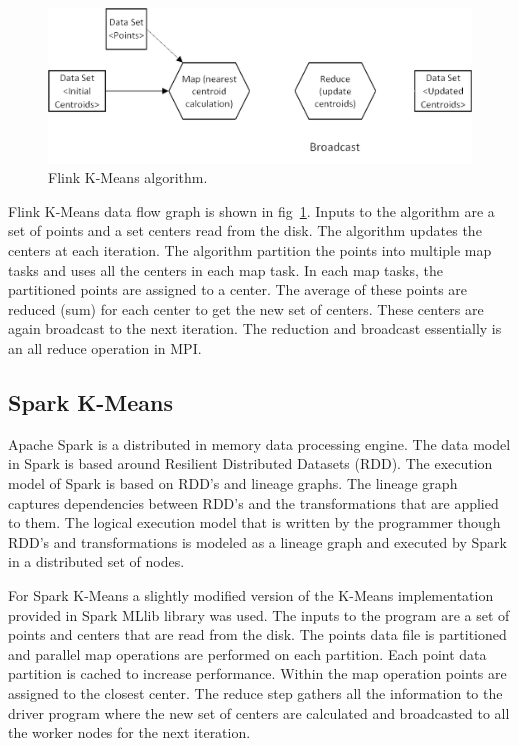 \documentclass[10pt, conference, compsocconf]{IEEEtran}
\begin{document}
\begin{figure}[!h]
\centering
\includegraphics[width=0.9\columnwidth]{images/fig_kmeans_dataflow}
\caption{Flink K-Means algorithm.}
\label{fig:fig_flink_kmeans}
\end{figure}

Flink K-Means data flow graph is shown in fig~\ref{fig:fig_flink_kmeans}. Inputs to the algorithm are a set of points and a set centers read from the disk. The algorithm updates the centers at each iteration. The algorithm partition the points into multiple map tasks and uses all the centers in each map task. In each map tasks, the partitioned points are assigned to a center. The average of these points are reduced (sum) for each center to get the new set of centers. These centers are again broadcast to the next iteration. The reduction and broadcast essentially is an all reduce operation in MPI.

\subsection{Spark K-Means}
Apache Spark is a distributed in memory data processing engine. The data model in Spark is based around Resilient Distributed Datasets (RDD). The execution model of Spark is based on RDD’s and lineage graphs. The lineage graph captures dependencies between RDD’s and the transformations that are applied to them. The logical execution model that is written by the programmer though RDD’s and transformations is modeled as a lineage graph and executed by Spark in a distributed set of nodes.

For Spark K-Means a slightly modified version of the K-Means implementation provided in Spark MLlib library was used. The inputs to the program are a set of points and centers that are read from the disk. The points data file is partitioned and parallel map operations are performed on each partition. Each point data partition is cached to increase performance. Within the map operation points are assigned to the closest center. The reduce step gathers all the information to the driver program where the new set of centers are calculated and broadcasted to all the worker nodes for the next iteration. 
\end{document}
